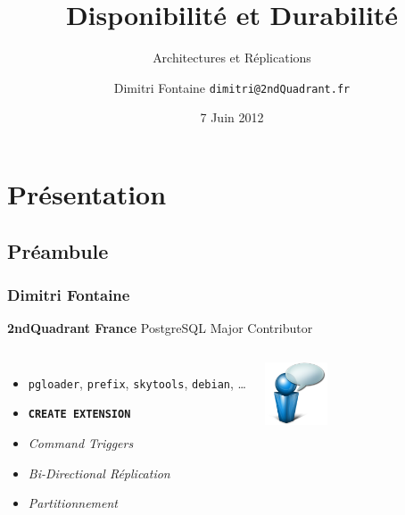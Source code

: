 \documentclass[english]{beamer}
\title{Disponibilité et Durabilité}
\subtitle{Architectures et Réplications}
\author{Dimitri Fontaine \newline\tiny{\texttt{dimitri@2ndQuadrant.fr}}}
\date{7 Juin 2012}
\begin{document}
\frame{\titlepage}

\section{Présentation}
\subsection{Préambule}
\frame{\tableofcontents[currentsection]}

\begin{frame}[fragile]
  \frametitle{Dimitri Fontaine}

  \begin{center}
    \textbf{2ndQuadrant France}
    \linebreak
    PostgreSQL Major Contributor
  \end{center}
  \linebreak

\begin{columns}[c]

  \begin{itemize}
   \item<1-> \texttt{pgloader}, \texttt{prefix}, \texttt{skytools}, \texttt{debian}, …
   \item<1-> \texttt{\textbf{CREATE EXTENSION}}
   \item<2-> \textit{Command Triggers}
   \item<2-> \textit{Bi-Directional Réplication}
   \item<3-> \textit{Partitionnement}
  \end{itemize}  

\begin{center}
  \includegraphics[height=5em]{bulle-blue-icon.png}
\end{center}
\end{columns}
\end{frame}
\end{document}
